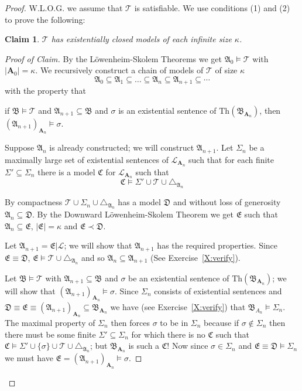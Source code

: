 \documentclass[titlepage, oneside]{amsbook}
\theoremstyle{plain}
\newtheorem*{claim}{Claim}
\theoremstyle{definition}
\theoremstyle{remark}
\newcommand{\bmt}{\ensuremath{\mathfrak B \models \mathcal T }}
\newcommand{\Th}{\ensuremath{\mbox{Th}}}
\newcommand{\theory}{\ensuremath{\mathcal{T}}}
\newcommand{\tee}{\ensuremath{\mathcal{T}}}
\newcommand{\lan}{\ensuremath{\mathcal{L}}}
\newcommand{\seq}{\ensuremath{\subseteq}}
\newcommand{\ma}{\ensuremath{\mathfrak{A}}}
\newcommand{\mb}{\ensuremath{\mathfrak{B}}}
\newcommand{\mc}{\ensuremath{\mathfrak{C}}}
\newcommand{\md}{\ensuremath{\mathfrak{D}}}
\newcommand{\me}{\ensuremath{\mathfrak{E}}}
\newcommand{\ba}{\ensuremath{\mathbf{A}}}
\begin{document}
\begin{proof} W.L.O.G. we assume that $\theory$ is satisfiable.
We use conditions (1) and (2) to prove the following:

\begin{claim} $\theory$ has  existentially closed models of each
infinite size $\kappa$.
\end{claim}

\begin{proof}[Proof of Claim]   By the L\"{o}wenheim-Skolem Theorems we
get $\ma_0 \models \theory$ with $|\ba_0| = \kappa$.  We recursively
construct a chain of models of $\tee$ of size $\kappa$ \[ \ma_0 \seq
\ma_1 \seq \dots \seq \ma_n \seq \ma_{n+1} \seq \cdots \]
with the property that 
\begin{center} if $\mb \models \tee$ and $\ma_{n+1} \seq \mb$
and $\sigma$ is an existential sentence of $\Th (\mb_{\ba_n})$, then
 $\left(\ma_{n+1} \right)_{\ba_n} \models \sigma$. \end{center}

Suppose $\ma_n$ is already constructed; we will construct $\ma_{n+1}$.
Let $\Sigma_n$ be a maximally large set of existential sentences of
$\lan_{\ba_n}$
such that for each finite  $\Sigma' \seq \Sigma_n$ there is a
model
$\mc$ for $\lan_{\ba_n}$ such that
\[\mc \models 
\Sigma' \cup \tee \cup \triangle_{\ma_n} \] 

 By compactness $\tee \cup \Sigma_n \cup
\triangle_{\ma_n}$ has a model $\md$ and without loss of generosity
$\ma_n
\seq \md$.  By the Downward L\"{o}wenheim-Skolem Theorem we get $\me$
such that 
$\ma_{n} \seq \me$, $|\me| = \kappa$ and $\me \prec \md$. 

Let $\ma_{n+1} = \me |\lan$; we will show that $\ma_{n+1}$ has the
required properties.  Since $\me \equiv \md$, $\me \models \tee \cup
\triangle_{\ma_n}$ and so $\ma_{n} \seq \ma_{n+1}$ (See
Exercise~\ref{X:verify}). 

Let $\bmt$ with $\ma_{n+1} \seq \mb$ and $\sigma$ be an existential
sentence of $\Th (\mb_{\ba_n})$; we will show that $(\ma_{n+1})_{\ba_n}  
\models \sigma$. Since $\Sigma_n$ consists of existential sentences and
$\md \equiv \me \equiv (\ma_{n+1})_{\ba_n} \seq \mb_{\ba_n}$ we have 
(see Exercise~\ref{X:verify}) that $\mb_{A_n} \models \Sigma_n$.
The maximal property
of $\Sigma_n$ then forces $\sigma$ to be in $\Sigma_n$ because if
$\sigma \notin \Sigma_n$ then there must be some finite $\Sigma' \seq
\Sigma_n$ for which there is no $\mc$ such that $\mc \models \Sigma'
\cup \{ \sigma \} \cup \tee \cup \triangle_{\ma_n}$; but $\mb_{\ba_n}$
is such a $\mc$!  Now since $\sigma \in \Sigma_n$ and $\me \equiv \md
\models \Sigma_n$ we must have $\me = (\ma_{n+1})_{\ba_n} \models
\sigma.$


\end{proof}
\end{proof}
\end{document}
